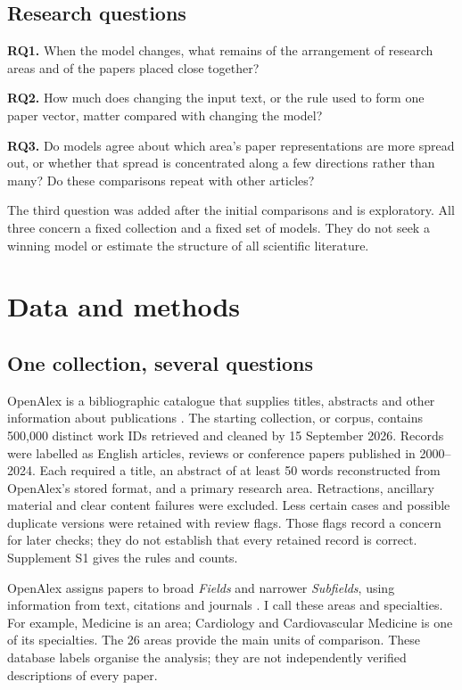 \documentclass[12pt]{article}
\begin{document}
\subsection{Research questions}
\textbf{RQ1.} When the model changes, what remains of the arrangement of research areas and of the papers placed close together?

\textbf{RQ2.} How much does changing the input text, or the rule used to form one paper vector, matter compared with changing the model?

\textbf{RQ3.} Do models agree about which area's paper representations are more spread out, or whether that spread is concentrated along a few directions rather than many? Do these comparisons repeat with other articles?

The third question was added after the initial comparisons and is exploratory. All three concern a fixed collection and a fixed set of models. They do not seek a winning model or estimate the structure of all scientific literature.

\section{Data and methods}
\subsection{One collection, several questions}
OpenAlex is a bibliographic catalogue that supplies titles, abstracts and other information about publications \citep{priem2022openalex}. The starting collection, or corpus, contains 500,000 distinct work IDs retrieved and cleaned by 15 September 2026. Records were labelled as English articles, reviews or conference papers published in 2000--2024. Each required a title, an abstract of at least 50 words reconstructed from OpenAlex's stored format, and a primary research area. Retractions, ancillary material and clear content failures were excluded. Less certain cases and possible duplicate versions were retained with review flags. Those flags record a concern for later checks; they do not establish that every retained record is correct. Supplement S1 gives the rules and counts.

OpenAlex assigns papers to broad \emph{Fields} and narrower \emph{Subfields}, using information from text, citations and journals \citep{openalex2026topics}. I call these areas and specialties. For example, Medicine is an area; Cardiology and Cardiovascular Medicine is one of its specialties. The 26 areas provide the main units of comparison. These database labels organise the analysis; they are not independently verified descriptions of every paper.
\end{document}

